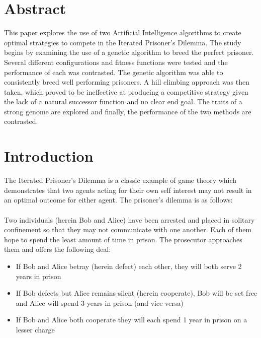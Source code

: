 \documentclass[12pt]{article}
\begin{document}
\maketitle

\pagebreak
\tableofcontents
\pagebreak

\section{Abstract}

This paper explores the use of two Artificial Intelligence algorithms to
create optimal strategies to compete in the Iterated Prisoner's Dilemma.  The
study begins by examining the use of a genetic algorithm to breed the perfect
prisoner.  Several different configurations and fitness functions were tested and
the performance of each was contrasted.  The genetic algorithm was able to
consistently breed well performing prisoners.
A hill climbing approach was then taken,
which proved to be ineffective at producing a competitive strategy given the
lack of a natural successor function and no clear end goal.  The traits
of a strong genome are explored and finally, the performance of the two methods are contrasted.

\pagebreak

\section{Introduction}
The Iterated Prisoner's Dilemma is a classic example of game theory which demonstrates
that two agents acting for their own self interest may not result in an
optimal outcome for either agent.  The prisoner's
dilemma is as follows: \\ \\
Two individuals (herein Bob and Alice) have been arrested and placed in solitary
confinement so that they may not communicate with one another.  Each of them hope
to spend the least amount of time in prison.  The prosecutor approaches them
and offers the following deal:
\begin{itemize}
    \item If Bob and Alice betray (herein defect) each other, they will
        both serve 2 years in prison
    \item If Bob defects but Alice remains silent (herein cooperate), Bob
        will be set free and Alice will spend 3 years in prison (and vice versa)
    \item If Bob and Alice both cooperate they will each spend 1 year in prison
        on a lesser charge \\
\end{itemize}
\end{document}
